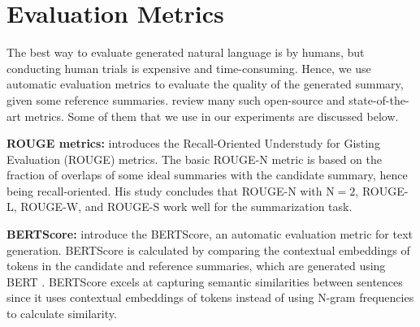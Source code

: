 \section{Evaluation Metrics}
	\label{sec:metrics}

	The best way to evaluate generated natural language is by humans, but conducting
	human trials is expensive and time-consuming.
	Hence, we use automatic evaluation metrics to evaluate the quality of the generated
	summary, given some reference summaries.
	\citet{fabbri2021summeval} review many such open-source and state-of-the-art metrics.
	Some of them that we use in our experiments are discussed below.

	\textbf{ROUGE metrics:} \citet{lin-2004-rouge} introduces the Recall-Oriented Understudy
	for Gisting Evaluation (ROUGE) metrics.
	The basic ROUGE-N metric is based on the fraction of overlaps of some ideal summaries
	with the candidate summary, hence being recall-oriented.
	His study concludes that ROUGE-N with $\text{N}=2$, ROUGE-L, ROUGE-W, and ROUGE-S work
	well for the summarization task.

	\textbf{BERTScore:} \citet{zhang2019bertscore} introduce the BERTScore, an automatic
	evaluation metric for text generation.
	BERTScore is calculated by comparing the contextual embeddings of tokens in the candidate
	and reference summaries, which are generated using BERT \cite{devlin2018bert}.
	BERTScore excels at capturing semantic similarities between sentences since it uses
	contextual embeddings of tokens instead of using N-gram frequencies to calculate similarity.
